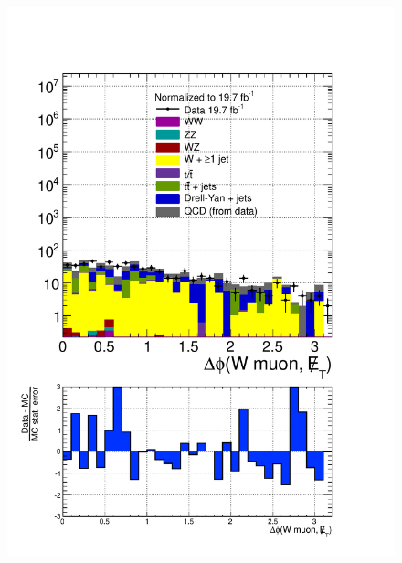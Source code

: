 \begin{figure}[hbtp]
  \begin{center}
    \includegraphics[width=\cmsFigWidth]{figures/dataVsMCQCD_dPhiWMuMET_lowMT_v87}

\end{center}
\end{figure}
